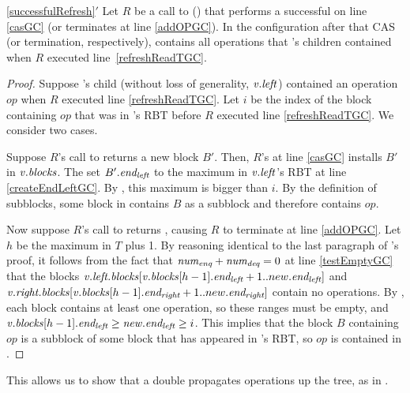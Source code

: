 \begin{customlemma}{\ref{successfulRefresh}$'$}
\label{successfulRefreshGC}
Let $R$ be a call to () that performs a successful  on line \ref{casGC} (or terminates at line \ref{addOPGC}).
In the configuration after that CAS (or termination, respectively),  contains all operations that 's children contained 
when $R$ executed line~\ref{refreshReadTGC}.
\end{customlemma}
\begin{proof}
Suppose 's child (without loss of generality, $\mbox{\textnormal{\textit{v}}}.\mbox{\textit{left}}$) contained an operation $op$ 
when $R$ executed line \ref{refreshReadTGC}.
Let $i$ be the index of the block containing $op$ that was in 's RBT before 
$R$ executed line \ref{refreshReadTGC}.
We consider two cases.

Suppose $R$'s call to  returns a new block $B'$.  Then, $R$'s  at line \ref{casGC} 
installs $B'$ in $\mbox{\textnormal{\textit{v}}}.\mbox{\textit{blocks}}$.
The  set $B'.\mbox{\textit{end\textsubscript{left}}}$ to the maximum  in $\mbox{\textnormal{\textit{v}}}.\mbox{\textit{left}}$'s RBT at line \ref{createEndLeftGC}.
By , this maximum  is bigger than $i$.
By the definition of subblocks, some block in  contains $B$ as a subblock
and therefore  contains $op$.

Now suppose $R$'s call to  returns \nl, causing $R$ to terminate at line \ref{addOPGC}.
Let $h$ be the maximum  in $T$ plus 1.
By reasoning identical to the last paragraph of 's proof,
it follows from the fact that $\mbox{\textnormal{\textit{num\textsubscript{enq}}}}+\mbox{\textnormal{\textit{num\textsubscript{deq}}}}=0$ at line \ref{testEmptyGC}
that the blocks $\mbox{\textnormal{\textit{v}}}.\mbox{\textit{left.blocks}}[\mbox{\textnormal{\textit{v}}}.\mbox{\textit{blocks}}[h-1].\mbox{\textit{end\textsubscript{left}}}+1..new.\mbox{\textit{end\textsubscript{left}}}]$ and
$\mbox{\textnormal{\textit{v}}}.\mbox{\textit{right.blocks}}[\mbox{\textnormal{\textit{v}}}.\mbox{\textit{blocks}}[h-1].\mbox{\textit{end\textsubscript{right}}}+1..new.\mbox{\textit{end\textsubscript{right}}}]$
contain no operations.
By , each block contains at least one operation, so
these ranges must be empty, and $\mbox{\textnormal{\textit{v}}}.\mbox{\textit{blocks}}[h-1].\mbox{\textit{end\textsubscript{left}}} \geq \mbox{\textnormal{\textit{new}}}.\mbox{\textit{end\textsubscript{left}}}\geq i$.
This implies that the block $B$ containing $op$ is a subblock of some block that has appeared
in 's RBT, so $op$ is contained in .
\end{proof}

This allows us to show that a double  propagates operations up the tree, 
as in .

